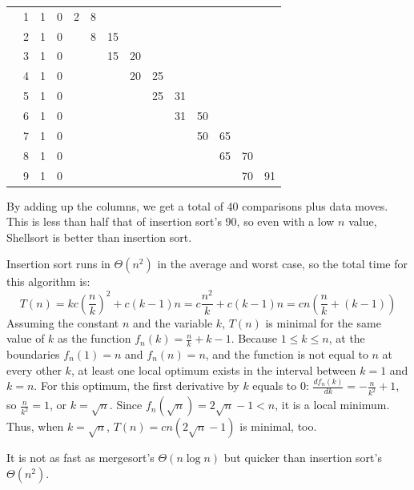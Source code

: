 \begin{center}
\begin{tabular}{|c|c|c|c|c|c|c|c|c|c|c|c|c|c|}
\cline{2-14}
& 1& 1& 0& 2& 8& & & & & & & & \\
\cline{2-14}
& 2& 1& 0& & 8& 15& & & & & & & \\
\cline{2-14}
& 3& 1& 0& & & 15& 20& & & & & & \\
\cline{2-14}
& 4& 1& 0& & & & 20& 25& & & & & \\
\cline{2-14}
& 5& 1& 0& & & & & 25& 31& & & & \\
\cline{2-14}
& 6& 1& 0& & & & & & 31& 50& & & \\
\cline{2-14}
& 7& 1& 0& & & & & & & 50& 65& & \\
\cline{2-14}
& 8& 1& 0& & & & & & & & 65& 70& \\
\cline{2-14}
& 9& 1& 0& & & & & & & & & 70& 91\\
\hline
\end{tabular}
\end{center}

By adding up the columns, we get a total of 40 comparisons plus data moves. 
This is less than half that of insertion sort's 90, 
so even with a low \(n\) value, Shellsort is better than insertion sort.

Insertion sort runs in \(\Theta(n^2)\) in the average and worst case, so
the total time for this algorithm is:
\[
T(n) =k c \left( \frac{n}{k} \right)^2 + c(k-1)n = c \frac{n^2}{k} + c(k-1)n  
= cn \left( \frac{n}{k} + (k-1) \right)  
\]
Assuming the constant $n$ and the variable $k$, 
\(T(n)\) is minimal for the same value of \(k\) as the function 
\( f_n(k)=\frac{n}{k} + k-1 \). Because \(1 \leq k \leq n\), at the boundaries
\(f_n(1) = n\) and \(f_n(n) = n\), and the function is not equal to \(n\) at every 
other \(k\), at least one local optimum exists in the interval
between \(k=1\) and \(k=n\). For this optimum, the  
first derivative by \(k\) equals to 0:
\(\frac{df_n(k)}{dk} = -\frac{n}{k^2} + 1 \), so \(\frac{n}{k^2} =1 \), or \(k= \sqrt{n} \).
Since \(f_n(\sqrt{n}) = 2\sqrt{n}-1 < n\), it is a local minimum.
Thus, when \(k = \sqrt{n}\), \(T(n) = cn(2\sqrt{n} -1)\) is minimal, too.

It is not as fast as mergesort's \(\Theta(n\log{n})\) but quicker 
than insertion sort's \(\Theta(n^2)\).

